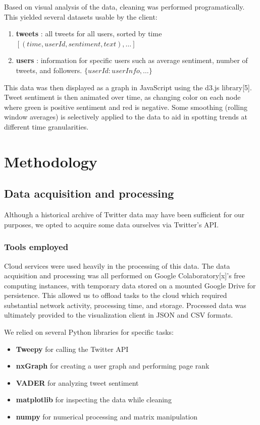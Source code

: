 \documentclass[11pt]{article}
\begin{document}
Based on visual analysis of the data, cleaning was performed programatically. This yielded several datasets usable by the client:
\begin{enumerate}
    \item \textbf{tweets} : all tweets for all users, sorted by time $[(time, userId, sentiment, text), \dots]$
    \item \textbf{users} : information for specific users such as average sentiment, number of tweets, and followers. $\{userId: userInfo, \dots\}$
\end{enumerate}

This data was then displayed as a graph in JavaScript using the d3.js library[5]. Tweet sentiment is then animated over time, as changing color on each node where green is positive sentiment and red is negative. Some smoothing (rolling window averages) is selectively applied to the data to aid in spotting trends at different time granularities.


\section{Methodology}

\subsection{Data acquisition and processing}

Although a historical archive of Twitter data may have been sufficient for our purposes, we opted to acquire some data ourselves via Twitter's API.

\subsubsection{Tools employed}

Cloud services were used heavily in the processing of this data. The data acquisition and processing was all performed on Google Colaboratory[x]'s free computing instances, with temporary data stored on a mounted Google Drive for persistence. This allowed us to offload tasks to the cloud which required substantial network activity, processing time, and storage. Processed data was ultimately provided to the visualization client in JSON and CSV formats.\newline

We relied on several Python libraries for specific tasks:
\begin{itemize}
    \item \textbf{Tweepy} for calling the Twitter API
    \item \textbf{nxGraph} for creating a user graph and performing page rank
    \item \textbf{VADER} for analyzing tweet sentiment
    \item \textbf{matplotlib} for inspecting the data while cleaning
    \item \textbf{numpy} for numerical processing and matrix manipulation
\end{itemize}
\end{document}
